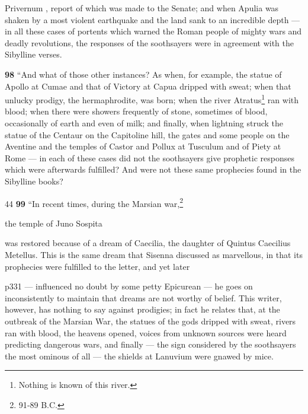 Privernum , report of which was made to the Senate; and when Apulia was shaken by a most violent earthquake and the land sank to an incredible depth \texthebrew{—} in all these cases of portents which warned the Roman people of mighty wars and deadly revolutions, the responses of the soothsayers were in agreement with the Sibylline verses.

\textbf{98} ``And what of those other instances? As when, for example, the statue of Apollo at Cumae and that of Victory at Capua dripped with sweat; when that unlucky prodigy, the hermaphrodite, was born; when the river Atratus\texthebrew{}\footnote{Nothing is known of this river.

} ran with blood; when there were showers frequently of stone, sometimes of blood, occasionally of earth and even of milk; and finally, when lightning struck the statue of the Centaur on the Capitoline hill, the gates and some people on the Aventine and the temples of Castor and Pollux at Tusculum and of Piety at Rome \texthebrew{—} in each of these cases did not the soothsayers give prophetic responses which were afterwards fulfilled? And were not these same prophecies found in the Sibylline books?

44
\textbf{99} ``In recent times, during the Marsian war,\texthebrew{}\footnote{91\texthebrew{‑}89 B.C.

}

the temple of Juno Sospita

was restored because of a dream of Caecilia, the daughter of Quintus Caecilius Metellus. This is the same dream that Sisenna discussed as marvellous, in that its prophecies were fulfilled to the letter, and yet later

p331 \texthebrew{—} influenced no doubt by some petty Epicurean \texthebrew{—} he goes on inconsistently to maintain that dreams are not worthy of belief. This writer, however, has nothing to say against prodigies; in fact he relates that, at the outbreak of the Marsian War, the statues of the gods dripped with sweat, rivers ran with blood, the heavens opened, voices from unknown sources were heard predicting dangerous wars, and finally \texthebrew{—} the sign considered by the soothsayers the most ominous of all \texthebrew{—} the shields at Lanuvium were gnawed by mice.

